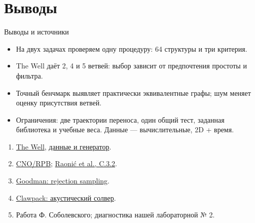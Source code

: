 \documentclass{beamer}
\begin{document}
\section{Выводы}
\begin{frame}{Выводы и источники}\footnotesize
\begin{itemize}
\item На двух задачах проверяем одну процедуру: 64 структуры и три критерия.
\item The Well даёт 2, 4 и 5 ветвей: выбор зависит от предпочтения простоты и фильтра.
\item Точный бенчмарк выявляет практически эквивалентные графы;
шум меняет оценку присутствия ветвей.
\item Ограничения: две траектории переноса, один общий тест, заданная библиотека
и учебные веса. Данные --- вычислительные, 2D + время.
\end{itemize}
\begin{enumerate}
\item \href{https://polymathic-ai.org/the_well/datasets/acoustic_scattering_maze/}{The Well},
\href{https://huggingface.co/datasets/polymathic-ai/acoustic_scattering_maze}{данные и генератор}.
\item \href{https://zenodo.org/records/10406879}{CNO/RPB};
\href{https://arxiv.org/html/2302.01178v2}{Raonić et al., C.3.2}.
\item \href{https://math.nyu.edu/~goodman/teaching/MonteCarlo07/notes/SimpleSampling.pdf}{Goodman: rejection sampling}.
\item \href{https://www.clawpack.org/gallery/pyclaw/gallery/acoustics_2d_interface.html}{Clawpack: акустический солвер}.
\item Работа Ф. Соболевского; диагностика нашей лабораторной № 2.
\end{enumerate}
\end{frame}
\end{document}
